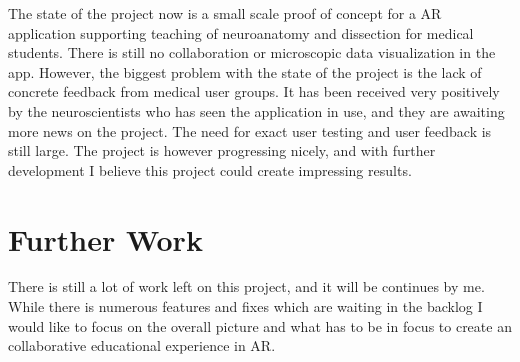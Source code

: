 The state of the project now is a small scale proof of concept for a AR application supporting teaching of neuroanatomy and dissection for medical students. There is still no collaboration or microscopic data visualization in the app. However, the biggest problem with the state of the project is the lack of concrete feedback from medical user groups. It has been received very positively by the neuroscientists who has seen the application in use, and they are awaiting more news on the project. The need for exact user testing and user feedback is still large. The project is however progressing nicely, and with further development I believe this project could create impressing results.


\section{Further Work}\label{chap:futurework}


There is still a lot of work left on this project, and it will be continues by me. While there is numerous features and fixes which are waiting in the backlog I would like to focus on the overall picture and what has to be in focus to create an collaborative educational experience in AR. 

